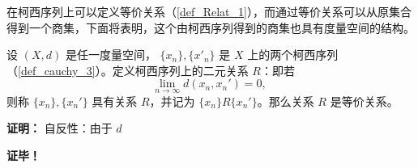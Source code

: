 
在柯西序列上可以定义等价关系（\autoref{def_Relat_1}），而通过等价关系可以从原集合得到一个商集，下面将表明，这个由柯西序列得到的商集也具有度量空间的结构。

\begin{theorem}{}
设 $(X,d)$ 是任一度量空间， $\{x_n\},\{x'_n\}$ 是 $X$ 上的两个柯西序列（\autoref{def_cauchy_3}）。定义柯西序列上的二元关系 $R$：即若
\begin{equation}
\lim_{n\rightarrow\infty}d(x_n,x_n')=0,~
\end{equation}
则称 $\{x_n\},\{x_n'\}$ 具有关系 $R$，并记为 $\{x_n\}R\{x_n'\}$。那么关系 $R$ 是等价关系。
\end{theorem}
\textbf{证明：}
自反性：由于 $d$

\textbf{证毕！}








